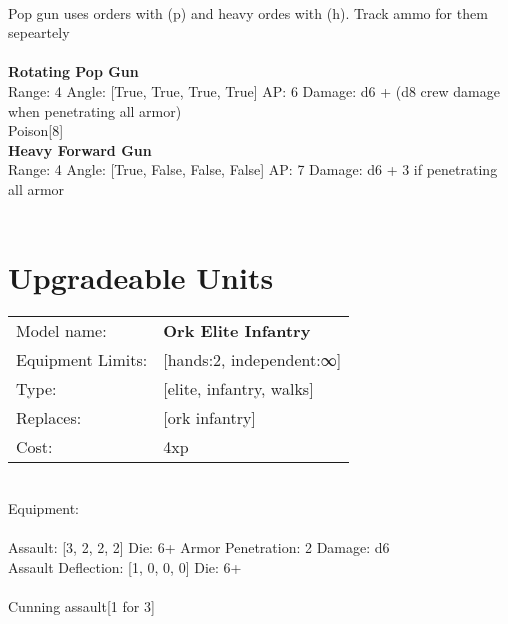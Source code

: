 \ \\
Pop gun uses orders with (p) and heavy ordes with (h). Track ammo for them sepeartely\\ 

\ \\
{\bf Rotating Pop Gun } \\



Range: 4  Angle: [True, True, True, True] AP: 6 Damage: d6 + (d8 crew damage when penetrating all armor) \\
Poison[8]\\ 




{\bf Heavy Forward Gun } \\



Range: 4  Angle: [True, False, False, False] AP: 7 Damage: d6 + 3 if penetrating all armor \\




 
\ \\













\section{Upgradeable Units}\noindent
\begin{tabular}{ll}
Model name: &{\bf Ork Elite Infantry } \\
Equipment Limits: &[hands:2, independent:∞] \\
Type: &[elite, infantry, walks] \\
Replaces: &[ork infantry] \\
Cost: & 4xp\\
\end{tabular}
\ \\
Equipment:  \\
\ \\
Assault: [3, 2, 2, 2] Die: 6+ Armor Penetration: 2 Damage: d6 \\
Assault Deflection: [1, 0, 0, 0] Die: 6+\\
\\ 
Cunning assault[1 for 3]\\ 
 
